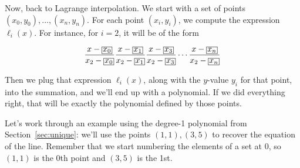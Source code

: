\documentclass[12 pt]{article}
\newcounter{example}[section]
\begin{document}
Now, back to Lagrange interpolation. We start with a set of points $(x_0, y_0), 
\ldots,\allowbreak (x_n, y_n)$. For each point $(x_i, y_i)$, we compute the 
expression $\ell_i(x)$. For instance, for $i=2$, it will be of the form

\newcommand{\cyan}[1]{\textcolor{cyan}{#1}}
\[
    \setlength{\fboxsep}{.3\fboxsep}
    \frac{x-\boxed{x_0}}{x_2-\boxed{x_0}}
    \frac{x-\boxed{x_1}}{x_2-\boxed{x_1}}
    \frac{x-\boxed{x_3}}{x_2-\boxed{x_3}}
    \cdots
    \frac{x-\boxed{x_n}}{x_2-\boxed{x_n}}
\]

Then we plug that expression $\ell_i(x)$, along with the $y$-value $y_i$ 
for that point, into the summation, and we'll end up with a polynomial. 
If we did everything right, that will be exactly the polynomial defined 
by those points.

Let's work through an example using the degree-1 polynomial from Section~\ref{sec:unique}:
we'll use the points $(1,1), (3,5)$ to recover the equation of the line. Remember that we 
start numbering the elements of a set at 0, so $(1,1)$ is the 0th point and $(3,5)$ is 
the 1st.
\end{document}
